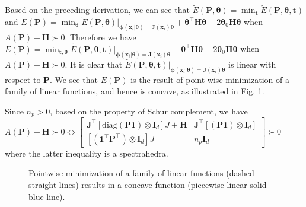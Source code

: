 \documentclass[11pt,bezier,]{article}
\begin{document}
{\proof
Based on the preceding derivation,
we can see that 
$\widetilde E(\mathbf P,\boldsymbol\theta)=
\min_{\mathbf t} \widetilde E(\mathbf P,\boldsymbol\theta,\mathbf t)$ 
and $E(\mathbf P)=\min_{\boldsymbol\theta} \widetilde E(\mathbf P,\boldsymbol\theta)|_{\boldsymbol\phi(\mathbf x_i|\boldsymbol\theta)=\mathbf J(\mathbf x_i) \boldsymbol\theta}+ \boldsymbol\theta^\top \mathbf H\boldsymbol\theta -2\boldsymbol\theta_0\mathbf H\boldsymbol\theta$ 
when $A(\mathbf P)+\mathbf H\succ 0$.
Therefore we have 
$E(\mathbf P)=\min_{\mathbf t,\boldsymbol\theta} 
\widetilde E(\mathbf P,\boldsymbol\theta,\mathbf t)|_{\boldsymbol\phi(\mathbf x_i|\boldsymbol\theta)
=\mathbf J(\mathbf x_i) \boldsymbol\theta}+ \boldsymbol\theta^\top \mathbf H\boldsymbol\theta -2\boldsymbol\theta_0\mathbf H\boldsymbol\theta$
when $A(\mathbf P)+\mathbf H\succ 0$.
It is clear that 
$ \widetilde E(\mathbf P,\boldsymbol\theta,\mathbf t)|_{\boldsymbol\phi(\mathbf x_i|\boldsymbol\theta)=\mathbf J(\mathbf x_i) \boldsymbol\theta}$ is  linear with respect to  $\mathbf P$.
We see that $E(\mathbf P)$ is the result of point-wise minimization of a family of linear functions,
and hence is concave, as illustrated in Fig. \ref{pointwise_min}.

Since $n_p>0$, based on the property of  Schur complement, %
we have $A(\mathbf P)+\mathbf H\succ 0 \Leftrightarrow 
\begin{bmatrix}
   \mathbf J^\top [\text{diag}(\mathbf P\mathbf 1)\otimes \mathbf I_d ] J +\mathbf H & \mathbf J^\top [(\mathbf P\mathbf 1)\otimes \mathbf I_d] \\
   [(\mathbf 1^\top \mathbf P^\top)\otimes \mathbf I_d]J & n_p \mathbf I_d
  \end{bmatrix}\succ 0
$ where the latter inequality is a spectrahedra.

}


\begin{figure}[h]
\centering
{}

\caption{ 
Pointwise minimization of a family of linear functions (dashed straight  lines) 
results in a concave function (piecewise linear solid blue  line).
\label{pointwise_min}
}
\end{figure}
\end{document}
